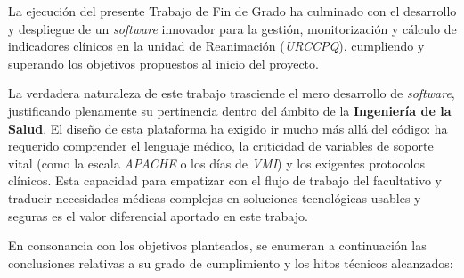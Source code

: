 La ejecución del presente Trabajo de Fin de Grado ha culminado con el desarrollo y despliegue de un \textit{software} innovador para la gestión, monitorización y cálculo de indicadores clínicos en la unidad de Reanimación (\textit{URCCPQ}), cumpliendo y superando los objetivos propuestos al inicio del proyecto.

La verdadera naturaleza de este trabajo trasciende el mero desarrollo de \textit{software}, justificando plenamente su pertinencia dentro del ámbito de la \textbf{Ingeniería de la Salud}. El diseño de esta plataforma ha exigido ir mucho más allá del código: ha requerido comprender el lenguaje médico, la criticidad de variables de soporte vital (como la escala \textit{APACHE} o los días de \textit{VMI}) y los exigentes protocolos clínicos. Esta capacidad para empatizar con el flujo de trabajo del facultativo y traducir necesidades médicas complejas en soluciones tecnológicas usables y seguras es el valor diferencial aportado en este trabajo.

En consonancia con los objetivos planteados, se enumeran a continuación las conclusiones relativas a su grado de cumplimiento y los hitos técnicos alcanzados:

